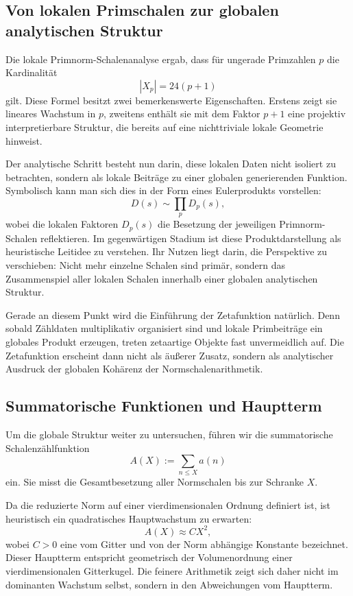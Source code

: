 \documentclass[a4paper,12pt]{article}
\theoremstyle{definition}
\numberwithin{equation}{section}
\begin{document}
	\subsection{Von lokalen Primschalen zur globalen analytischen Struktur}
	
	Die lokale Primnorm-Schalenanalyse ergab, dass für ungerade Primzahlen $p$ die Kardinalität
	\[
	|X_p| = 24(p+1)
	\]
	gilt. Diese Formel besitzt zwei bemerkenswerte Eigenschaften. Erstens zeigt sie lineares Wachstum in $p$, zweitens enthält sie mit dem Faktor $p+1$ eine projektiv interpretierbare Struktur, die bereits auf eine nichttriviale lokale Geometrie hinweist.
	
	Der analytische Schritt besteht nun darin, diese lokalen Daten nicht isoliert zu betrachten, sondern als lokale Beiträge zu einer globalen generierenden Funktion. Symbolisch kann man sich dies in der Form eines Eulerprodukts vorstellen:
	\[
	D(s) \sim \prod_p D_p(s),
	\]
	wobei die lokalen Faktoren $D_p(s)$ die Besetzung der jeweiligen Primnorm-Schalen reflektieren. Im gegenwärtigen Stadium ist diese Produktdarstellung als heuristische Leitidee zu verstehen. Ihr Nutzen liegt darin, die Perspektive zu verschieben: Nicht mehr einzelne Schalen sind primär, sondern das Zusammenspiel aller lokalen Schalen innerhalb einer globalen analytischen Struktur.
	
	Gerade an diesem Punkt wird die Einführung der Zetafunktion natürlich. Denn sobald Zähldaten multiplikativ organisiert sind und lokale Primbeiträge ein globales Produkt erzeugen, treten zetaartige Objekte fast unvermeidlich auf. Die Zetafunktion erscheint dann nicht als äußerer Zusatz, sondern als analytischer Ausdruck der globalen Kohärenz der Normschalenarithmetik.
	
	\subsection{Summatorische Funktionen und Hauptterm}
	
	Um die globale Struktur weiter zu untersuchen, führen wir die summatorische Schalenzählfunktion
	\[
	A(X) := \sum_{n\leq X} a(n)
	\]
	ein. Sie misst die Gesamtbesetzung aller Normschalen bis zur Schranke $X$.
	
	Da die reduzierte Norm auf einer vierdimensionalen Ordnung definiert ist, ist heuristisch ein quadratisches Hauptwachstum zu erwarten:
	\[
	A(X) \approx C X^2,
	\]
	wobei $C>0$ eine vom Gitter und von der Norm abhängige Konstante bezeichnet. Dieser Hauptterm entspricht geometrisch der Volumenordnung einer vierdimensionalen Gitterkugel. Die feinere Arithmetik zeigt sich daher nicht im dominanten Wachstum selbst, sondern in den Abweichungen vom Hauptterm.
	
\end{document}
